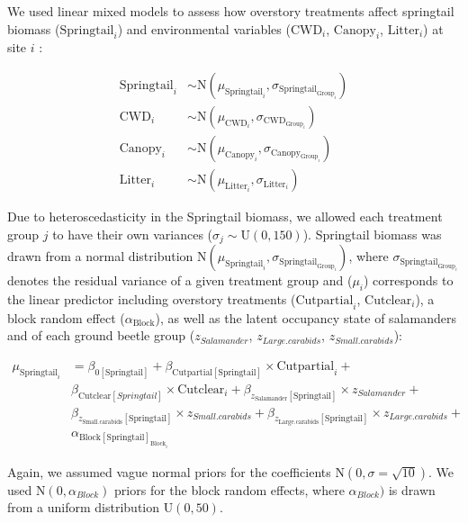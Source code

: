 We used linear mixed models to assess how overstory treatments affect springtail biomass ($\text{Springtail}_{i}$) and 
environmental variables ($\text{CWD}_{i}$, $\text{Canopy}_{i}$, $\text{Litter}_{i}$) at site $i$ :

\begin{align}
  \text{Springtail}_{i} &\sim \text{N} (\mu_{\text{Springtail}_i}, \sigma_{\text{Springtail}_{\text{Group}_i}}) \nonumber \\
  \text{CWD}_{i} &\sim \text{N} (\mu_{\text{CWD}_i}, \sigma_{\text{CWD}_{\text{Group}_i}}) \\
  \text{Canopy}_{i} &\sim \text{N} (\mu_{\text{Canopy}_i}, \sigma_{\text{Canopy}_{\text{Group}_i}}) \nonumber \\
  \text{Litter}_{i} &\sim \text{N} (\mu_{\text{Litter}_i}, \sigma_{\text{Litter}_{i}}) \nonumber 
\end{align}

Due to heteroscedasticity in the Springtail biomass, we allowed each treatment group $j$ to have their own variances ($\sigma_j \sim \text{U}(0,150)$). 
Springtail biomass was drawn from a normal distribution $\text{N} (\mu_{\text{Springtail}_i}, \sigma_{\text{Springtail}_{\text{Group}_i}})$, where $\sigma_{\text{Springtail}_{\text{Group}_i}}$ denotes the 
residual variance of a given treatment group and ($\mu_{i}$) corresponds to the linear predictor including overstory treatments ($\text{Cutpartial}_i$, $\text{Cutclear}_i$), 
a block random effect ($\alpha_{\text{Block}}$), as well as the latent occupancy state of salamanders and of each ground beetle group 
($z_{Salamander}$, $z_{Large.carabids}$, $z_{Small.carabids}$):


\begin{align}
  \mu_{\text{Springtail}_i} &= \beta_{0[\text{Springtail}]} + \beta_{\text{Cutpartial}[\text{Springtail}]} \times \text{Cutpartial}_i + \nonumber\\
  &\beta_{\text{Cutclear}[Springtail]} \times \text{Cutclear}_i + \beta_{z_{\text{Salamander}}[\text{Springtail}]} \times z_{Salamander} +  \nonumber\\
  &\beta_{z_{\text{Small.carabids}}[\text{Springtail}]} \times z_{Small.carabids} + \beta_{z_{\text{Large.carabids}}[\text{Springtail}]} \times z_{Large.carabids} + \nonumber\\
  &\alpha_{\text{Block}[\text{Springtail}]_{\text{Block}_i}} \nonumber
\end{align}


Again, we assumed vague normal priors for the coefficients $\text{N}(0, \sigma = \sqrt{10})$. 
We used $\text{N}(0, \alpha_{Block})$ priors for the block random effects, where $\alpha_{Block})$ is drawn from a uniform distribution $\text{U}(0, 50)$. 


